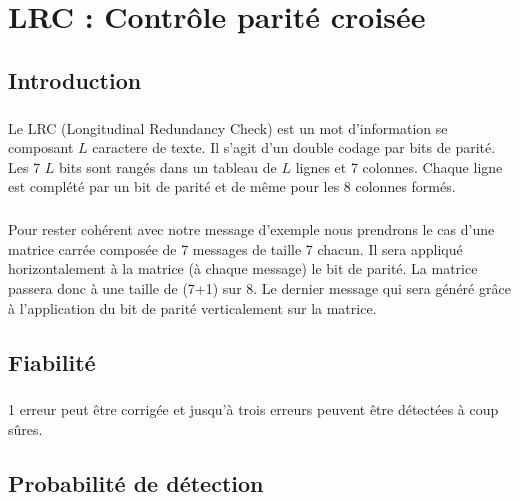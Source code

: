 
\chapter{LRC : Contrôle parité croisée}

    \section{Introduction}

        \paragraph{}
Le LRC (Longitudinal Redundancy Check) est un mot d'information se composant $L$ caractere de texte.
Il s'agit d'un double codage par bits de parité. Les 7 $L$ bits sont rangés dans un tableau de $L$ lignes et 7 colonnes.
Chaque ligne est complété par un bit de parité et de même pour les 8 colonnes formés.
        \paragraph{}
Pour rester cohérent avec notre message d'exemple nous prendrons le cas d'une matrice carrée composée de 7 messages de taille 7 chacun.
Il sera appliqué horizontalement à la matrice (à chaque message) le bit de parité.
La matrice passera donc à une taille de (7+1) sur 8.
Le dernier message qui sera généré grâce à l'application du bit de parité verticalement sur la matrice.


    \clearpage

    \section{Fiabilité}

        \paragraph{}
1 erreur peut être corrigée et jusqu’à trois erreurs peuvent être détectées à coup sûres.


    \section{Probabilité de détection}

